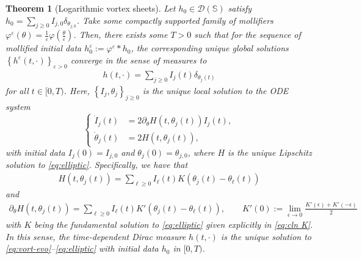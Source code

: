 \documentclass[10pt]{article}
\newtheorem{theorem}{Theorem}[section]
\theoremstyle{definition}
\theoremstyle{remark}
\numberwithin{equation}{section}
\newcommand{\0}{\emptyset}
\newcommand{\dlt}{\delta}
\newcommand{\eps}{\epsilon}
\newcommand{\tht}{\theta}
\newcommand{\varep}{\varepsilon}
\newcommand{\bbS}{\mathbb S}
\newcommand{\calD}{\mathcal D}
\begin{document}
	\begin{theorem}[Logarithmic vortex sheets]\label{thm:wp-Dirac}
		Let $h_0 \in \calD(\bbS)$ satisfy $h_0= \sum_{ j\ge0} I_{j,0} \dlt_{\tht_{j,0}}$. Take some compactly supported family of mollifiers $\varphi^{\varep}(\tht)=\frac{1}{\varep}\varphi(\frac{\tht}{\varep})$. Then, there exists some $T>0$ such that for the sequence of mollified initial data $h_0^{\varep} := \varphi^\varep * h_0$, the corresponding unique global solutions $\left\{ h^{\varep}(t,\cdot)\right\}_{\varep>0} $ converge in the sense of measures to \begin{equation*}
			\begin{split}
				h(t,\cdot) = \sum_{ j\ge0} I_j(t) \dlt_{\tht_j(t)}
			\end{split}
		\end{equation*} for all $t\in[0,T)$. Here, $\left\{ I_j, \tht_j \right\}_{j\ge0 }$ is the unique local solution to the ODE system \begin{equation}\label{eq:ODE}
			\left\{
			\begin{aligned}
				\dot{I}_j(t) & = 2 \partial_{\theta} H(t,\tht_j(t)) I_j(t), \\
				\dot{\tht}_j(t) & = 2H(t,\tht_j(t)),
			\end{aligned}
			\right.
		\end{equation} with initial data $I_j(0)=I_{j,0}$ and $\tht_j(0)=\tht_{j,0}$, where $H$ is the unique Lipschitz solution to \eqref{eq:elliptic}. Specifically, we have that \begin{equation}\label{eq:Dirac-H-explicit}
			\begin{split}
				H(t,\tht_{j}(t)) = \sum_{\ell\ge0} I_{\ell}(t) K(\tht_{j}(t) - \tht_{\ell}(t) )
			\end{split}
		\end{equation} and \begin{equation}\label{eq:Dirac-Hprime-explicit}
			\begin{split}
				\partial_{\theta} H(t,\tht_j(t)) = \sum_{\ell\ge0} I_{\ell}(t) K'(\tht_{j}(t) - \tht_{\ell}(t) ), \qquad K'(0) := \lim_{\eps \to 0} \frac{K'(\eps) + K'(-\eps)}{2}
			\end{split}
		\end{equation} with $K$ being the fundamental solution to \eqref{eq:elliptic} given explicitly in \eqref{eq:cln K}. In this sense, the time-dependent Dirac measure $h(t,\cdot)$ is the unique solution to \eqref{eq:vort-evo}--\eqref{eq:elliptic} with initial data $h_0$ in $[0,T)$. 
	\end{theorem} 
\end{document}
